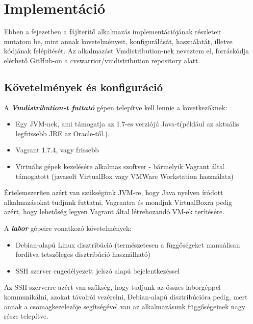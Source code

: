 \chapter{Implementáció}
\label{chp:implementation}
Ebben a fejezetben a fájlterítő alkalmazás implementációjának részleteit mutatom be, mint annak követelményeit, konfigurálását, használatát, illetve kódjának felépítését.
Az alkalmazást Vmdistribution-nek neveztem el, forráskódja elérhető GitHub-on a cvswarrior/vmdistribution repository alatt\cite{vmdistribution}.

\section{Követelmények és konfiguráció}

A \textit{\textbf{Vmdistribution-t futtató}} gépen telepítve kell lennie a következőknek:
\begin{itemize}
  \item Egy JVM-nek\cite{stark2001java}, ami támogatja az 1.7-es verziójú Java-t(például az aktuális legfrissebb JRE az Oracle-től\cite{oraclejre}.).
  \item Vagrant 1.7.4, vagy frissebb
  \item Virtuális gépek kezelésére alkalmas szoftver - bármelyik Vagrant által támogatott\cite{vagrantproviders} (javasolt VirtualBox vagy VMWare Workstation használata)
\end{itemize}
Értelemszerűen azért van szükségünk JVM-re, hogy Java nyelven íródott alkalmazásokat tudjunk futtatni, Vagrantra és mondjuk VirtualBoxra pedig azért, hogy lehetőség legyen Vagrant által létrehozandó VM-ek terítésére.

A \textit{\textbf{labor}} gépeire vonatkozó követelmények:
\begin{itemize}
  \item Debian-alapú Linux disztribúció (természetesen a függőségeket manuálisan fordítva tetszőleges disztribúció használható)
  \item SSH szerver engedélyezett jelszó alapú bejelentkezéssel
\end{itemize}
Az SSH szerverre azért van szükség, hogy tudjunk az összes laborgéppel kommunikálni, azokat távolról vezérelni, Debian-alapú disztribúcióra pedig, mert annak a csomagkezelezője segítségével van az alkalmazásunk függőségeinek nagy része telepítve.

